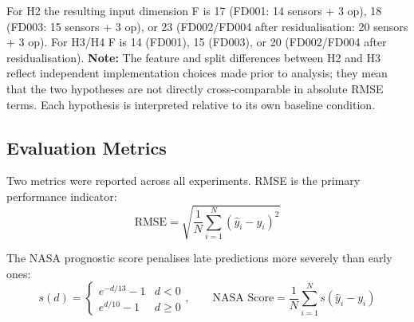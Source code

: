 \documentclass[preprint,10pt]{elsarticle}
\begin{document}
\begin{table}[!t]
\centering
\small
\caption{Feature set, validation split, and backbone by hypothesis}
\label{tab:iii}
\end{table}


For H2 the resulting input dimension F is 17 (FD001: 14 sensors + 3 op), 18 (FD003: 15 sensors + 3 op), or 23 (FD002/FD004 after residualisation: 20 sensors + 3 op). For H3/H4 F is 14 (FD001), 15 (FD003), or 20 (FD002/FD004 after residualisation). \textbf{Note:} The feature and split differences between H2 and H3 reflect independent implementation choices made prior to analysis; they mean that the two hypotheses are not directly cross-comparable in absolute RMSE terms. Each hypothesis is interpreted relative to its own baseline condition.

\subsection{Evaluation Metrics}

Two metrics were reported across all experiments. RMSE is the primary performance indicator:
\begin{equation}
\text{RMSE} = \sqrt{\frac{1}{N}\sum_{i=1}^{N}(\hat{y}_i - y_i)^2}
\end{equation}

The NASA prognostic score penalises late predictions more severely than early ones:
\begin{equation}
s(d) = \begin{cases} e^{-d/13} - 1 & d < 0 \\ e^{d/10} - 1 & d \geq 0 \end{cases}, \qquad
\text{NASA Score} = \frac{1}{N}\sum_{i=1}^{N} s(\hat{y}_i - y_i)
\end{equation}
\end{document}
